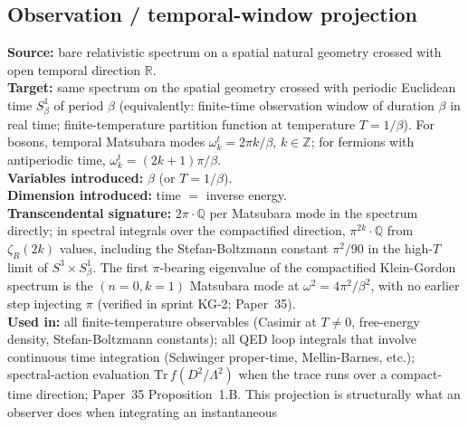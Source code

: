 \documentclass[11pt]{article}
\begin{document}
\subsection{Observation / temporal-window projection}
\label{sec:proj_observation}
\textbf{Source:} bare relativistic spectrum on a spatial natural
geometry crossed with open temporal direction $\mathbb{R}$.\\
\textbf{Target:} same spectrum on the spatial geometry crossed with
periodic Euclidean time $S^1_\beta$ of period $\beta$ (equivalently:
finite-time observation window of duration $\beta$ in real time;
finite-temperature partition function at temperature $T = 1/\beta$).
For bosons, temporal Matsubara modes $\omega^t_k = 2\pi k / \beta$,
$k \in \mathbb{Z}$; for fermions with antiperiodic time,
$\omega^t_k = (2k+1)\pi / \beta$.\\
\textbf{Variables introduced:} $\beta$ (or $T = 1/\beta$).\\
\textbf{Dimension introduced:} time $=$ inverse energy.\\
\textbf{Transcendental signature:} $2\pi \cdot \mathbb{Q}$ per
Matsubara mode in the spectrum directly; in spectral integrals over
the compactified direction, $\pi^{2k} \cdot \mathbb{Q}$ from
$\zeta_R(2k)$ values, including the Stefan-Boltzmann
constant $\pi^2/90$ in the high-$T$ limit of $S^3 \times S^1_\beta$.
The first $\pi$-bearing eigenvalue of the compactified Klein-Gordon
spectrum is the $(n{=}0, k{=}1)$ Matsubara mode at
$\omega^2 = 4\pi^2/\beta^2$, with no earlier step injecting $\pi$
(verified in sprint KG-2; Paper~35).\\
\textbf{Used in:} all finite-temperature observables (Casimir at
$T \neq 0$, free-energy density, Stefan-Boltzmann constants); all
QED loop integrals that involve continuous time integration (Schwinger
proper-time, Mellin-Barnes, etc.); spectral-action evaluation
$\mathrm{Tr}\, f(D^2/\Lambda^2)$ when the trace runs over a
compact-time direction; Paper~35 Proposition~1.B.  This projection is
structurally what an observer does when integrating an instantaneous
\end{document}

